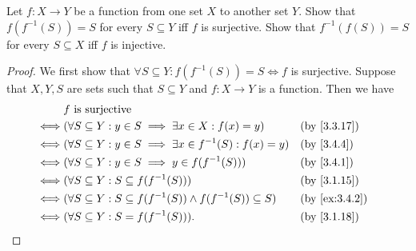 \begin{ex}\label{ex:3.4.5}
	Let \(f : X \to Y\) be a function from one set \(X\) to another set \(Y\).
	Show that \(f(f^{-1}(S)) = S\) for every \(S \subseteq Y\) iff \(f\) is surjective.
	Show that \(f^{-1}(f(S)) = S\) for every \(S \subseteq X\) iff \(f\) is injective.
\end{ex}

\begin{proof}
	We first show that \(\forall S \subseteq Y : f(f^{-1}(S)) = S \iff f\) is surjective.
	Suppose that \(X, Y, S\) are sets such that \(S \subseteq Y\) and \(f : X \to Y\) is a function.
	Then we have
	\begin{align*}
		     & f \text{ is surjective}                                                                              \\
		\iff & (\forall S \subseteq Y : y \in S \implies \exists x \in X : f(x) = y)             &  & \by{3.3.17}   \\
		\iff & (\forall S \subseteq Y : y \in S \implies \exists x \in f^{-1}(S) : f(x) = y)     &  & \by{3.4.4}    \\
		\iff & (\forall S \subseteq Y : y \in S \implies y \in f(f^{-1}(S)))                     &  & \by{3.4.1}    \\
		\iff & (\forall S \subseteq Y : S \subseteq f(f^{-1}(S)))                                &  & \by{3.1.15}   \\
		\iff & (\forall S \subseteq Y : S \subseteq f(f^{-1}(S)) \land f(f^{-1}(S)) \subseteq S) &  & \by{ex:3.4.2} \\
		\iff & (\forall S \subseteq Y : S = f(f^{-1}(S))).                                       &  & \by{3.1.18}
	\end{align*}


\end{proof}
